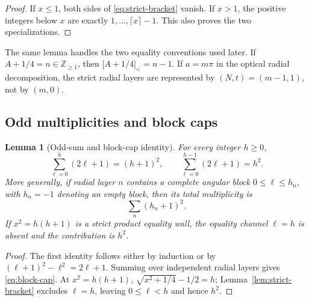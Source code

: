 \documentclass[11pt]{article}
\newtheorem{lemma}[theorem]{Lemma}
\theoremstyle{definition}
\theoremstyle{remark}
\newcommand{\strictbr}[1]{\mathopen{[}#1\mathclose{]}_{<}}
\begin{document}
\begin{proof}
If \(x\leq1\), both sides of \eqref{eq:strict-bracket} vanish.  If
\(x>1\), the positive integers below \(x\) are exactly
\(1,\ldots,\lceil x\rceil-1\).  This also proves the two specializations.
\end{proof}

The same lemma handles the two equality conventions used later.  If
\(A+1/4=n\in\mathbb Z_{\geq1}\), then
\(\strictbr{A+1/4}=n-1\).  If \(a=m\pi\) in the optical radial
decomposition, the strict radial layers are represented by
\((N,t)=(m-1,1)\), not by \((m,0)\).

\subsection{Odd multiplicities and block caps}

\begin{lemma}[Odd-sum and block-cap identity]
\label{lem:block-cap}
For every integer \(h\geq0\),
\begin{equation}
 \sum_{\ell=0}^{h}(2\ell+1)=(h+1)^2,
 \qquad
 \sum_{\ell=0}^{h-1}(2\ell+1)=h^2.
 \label{eq:odd-sum}
\end{equation}
More generally, if radial layer \(n\) contains a complete angular block
\(0\leq\ell\leq h_n\), with \(h_n=-1\) denoting an empty block, then its
total multiplicity is
\begin{equation}
 \sum_n (h_n+1)^2.
 \label{eq:block-cap}
\end{equation}
If \(x^2=h(h+1)\) is a strict product equality wall, the equality channel
\(\ell=h\) is absent and the contribution is \(h^2\).
\end{lemma}

\begin{proof}
The first identity follows either by induction or by
\((\ell+1)^2-\ell^2=2\ell+1\).  Summing over independent radial layers
gives \eqref{eq:block-cap}.  At \(x^2=h(h+1)\),
\(\sqrt{x^2+1/4}-1/2=h\); Lemma~\ref{lem:strict-bracket} excludes
\(\ell=h\), leaving \(0\leq\ell<h\) and hence \(h^2\).
\end{proof}
\end{document}
